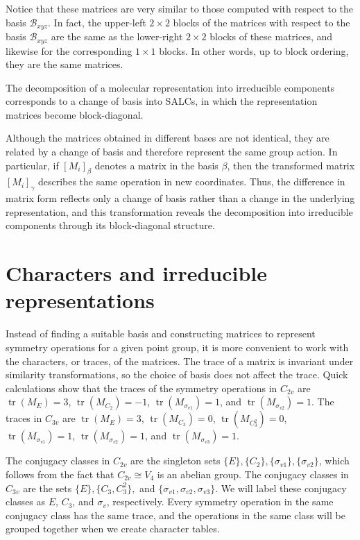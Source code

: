 \documentclass{article}
\DeclareMathOperator{\tr}{tr}
\begin{document}
    Notice that these matrices are very similar to those computed with respect to the basis $\mathcal B_{xyz}$. In fact, the upper-left $2\times 2$ blocks of the matrices with respect to the basis $\mathcal B_{xyz}$ are the same as the lower-right $2\times 2$ blocks of these matrices, and likewise for the corresponding $1\times 1$ blocks. In other words, up to block ordering, they are the same matrices.

    The decomposition of a molecular representation into irreducible components corresponds to a change of basis into SALCs, in which the representation matrices become block-diagonal.
    
    Although the matrices obtained in different bases are not identical, they are related by a change of basis and therefore represent the same group action. In particular, if $[M_i]_\beta$ denotes a matrix in the basis $\beta$, then the transformed matrix $[M_i]_\gamma$ describes the same operation in new coordinates. Thus, the difference in matrix form reflects only a change of basis rather than a change in the underlying representation, and this transformation reveals the decomposition into irreducible components through its block-diagonal structure.

    \section{Characters and irreducible representations}

    Instead of finding a suitable basis and constructing matrices to represent symmetry operations for a given point group, it is more convenient to work with the characters, or traces, of the matrices. The trace of a matrix is invariant under similarity transformations, so the choice of basis does not affect the trace. Quick calculations show that the traces of the symmetry operations in $C_{2v}$ are $\tr(M_E) = 3$, $\tr(M_{C_2})=-1$, $\tr(M_{\sigma_{v1}})=1$, and $\tr(M_{\sigma_{v2}})=1$. The traces in $C_{3v}$ are $\tr(M_E)=3$, $\tr(M_{C_3})=0$, $\tr(M_{C_3^2})=0$, $\tr(M_{\sigma_{v1}})=1$, $\tr(M_{\sigma_{v2}})=1$, and $\tr(M_{\sigma_{v3}})=1$.

    The conjugacy classes in $C_{2v}$ are the singleton sets $\{E\}, \{C_2\}, \{\sigma_{v1}\}, \{\sigma_{v2}\}$, which follows from the fact that $C_{2v}\cong V_4$ is an abelian group. The conjugacy classes in $C_{3v}$ are the sets $\{E\}, \{C_3,C_3^2\},$ and $\{\sigma_{v1},\sigma_{v2},\sigma_{v3}\}$. We will label these conjugacy classes as $E$, $C_3$, and $\sigma_v$, respectively. Every symmetry operation in the same conjugacy class has the same trace, and the operations in the same class will be grouped together when we create character tables.
\end{document}
